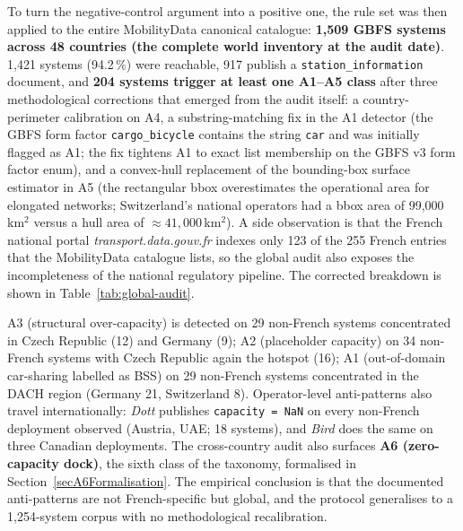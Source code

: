 \documentclass[11pt,a4paper]{article}
\begin{document}
\label{secGlobalAudit}%
To turn the negative-control argument into a positive one, the rule
set was then applied to the entire MobilityData canonical catalogue:
\textbf{1{,}509 GBFS systems across 48 countries (the complete world
inventory at the audit date)}. 1{,}421 systems (94.2\,\%) were
reachable, 917 publish a \texttt{station\_information} document, and
\textbf{204 systems trigger at least one A1--A5 class} after three
methodological corrections that emerged from the audit itself: a
country-perimeter calibration on A4, a substring-matching fix in the
A1 detector (the GBFS form factor \texttt{cargo\_bicycle} contains
the string \texttt{car} and was initially flagged as A1; the fix
tightens A1 to exact list membership on the GBFS v3 form factor
enum), and a convex-hull replacement of the bounding-box surface
estimator in A5 (the rectangular bbox overestimates the operational
area for elongated networks; Switzerland's national operators had a
bbox area of 99{,}000\,km$^2$ versus a hull area of
$\approx 41{,}000$\,km$^2$). A side observation is that the French
national portal \emph{transport.data.gouv.fr} indexes only 123 of
the 255 French entries that the MobilityData catalogue lists, so
the global audit also exposes the incompleteness of the national
regulatory pipeline. The corrected breakdown is shown in
Table~\ref{tab:global-audit}.

A3 (structural over-capacity) is detected on 29 non-French systems
concentrated in Czech Republic (12) and Germany (9); A2 (placeholder
capacity) on 34 non-French systems with Czech Republic again the
hotspot (16); A1 (out-of-domain car-sharing labelled as BSS) on 29
non-French systems concentrated in the DACH region (Germany 21,
Switzerland 8). Operator-level anti-patterns also travel
internationally: \emph{Dott} publishes \texttt{capacity = NaN} on
every non-French deployment observed (Austria, UAE; 18 systems),
and \emph{Bird} does the same on three Canadian deployments. The
cross-country audit also surfaces \textbf{A6 (zero-capacity dock)},
the sixth class of the taxonomy, formalised in
Section~\ref{secA6Formalisation}. The empirical conclusion is that
the documented anti-patterns are not French-specific but global,
and the protocol generalises to a 1{,}254-system corpus with no
methodological recalibration.
\end{document}
